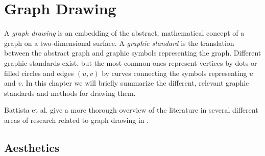 
\chapter{Graph Drawing}\label{chap:graph_drawing}

A \emph{graph drawing} is an embedding of the abstract, mathematical concept
of a graph on a two-dimensional surface. A \emph{graphic standard} is the
translation between the abstract graph and graphic symbols representing the
graph. Different graphic standards exist, but the most common ones represent
vertices by dots or filled circles and edges $(u,v)$ by curves connecting the
symbols representing $u$ and $v$. In this chapter we will briefly summarize
the different, relevant graphic standards and methods for drawing them.

Battista et al. give a more thorough overview of the literature in several
different areas of research related to graph drawing in \cite{DiBattista1994}.

\section{Aesthetics}

